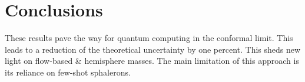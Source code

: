 \section{Conclusions}\label{sec:conclusions}

These results pave the way for quantum computing in the conformal limit.
This leads to a reduction of the theoretical uncertainty by one percent.
This sheds new light on flow-based & hemisphere masses. The main
limitation of this approach is its reliance on few-shot sphalerons.

